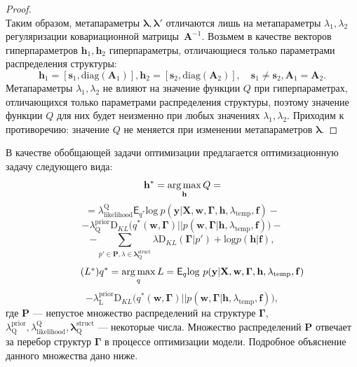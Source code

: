 \begin{proof}
\[\]
Таким образом, метапараметры $\boldsymbol{\lambda},\boldsymbol{\lambda}'$ отличаются лишь на метапараметры  $\lambda_1, \lambda_2$ регуляризации ковариационной матрицы~$\mathbf{A}^{-1}$. 
Возьмем в качестве векторов гиперпараметров $\mathbf{h}_1,\mathbf{h}_2$ гиперпараметры, отличающиеся только параметрами распределения структуры:
\[
    \mathbf{h}_1 = [\mathbf{s}_1, \text{diag}(\mathbf{A}_1)], \mathbf{h}_2 = [\mathbf{s}_2, \text{diag}(\mathbf{A}_2)],\quad \mathbf{s}_1 \neq \mathbf{s}_2, \mathbf{A}_1 = \mathbf{A}_2.
\]
Метапараметры $\lambda_1, \lambda_2$ не влияют на значение функции $Q$ при гиперпараметрах, отличающихся только параметрами распределения структуры, поэтому значение функции $Q$ для них будет неизменно при любых значениях $\lambda_1, \lambda_2$. Приходим к противоречию: значение $Q$ не меняется при изменении метапараметров $\boldsymbol{\lambda}$.

\end{proof}

В качестве обобщающей задачи оптимизации предлагается оптимизационную задачу следующего вида:
\begin{equation}
\label{eq:qopt}
\mathbf{h}^{*} = \operatorname*{arg\,max}_{\mathbf{h}} Q = 
\end{equation}
\[
= {\lambda_\text{likelihood}^\text{Q}\mathsf{E}_{{q}^{*}} \text{log}~{p(\mathbf{y} | \mathbf{X}, \mathbf{w},\boldsymbol{\Gamma}, \mathbf{h}, \lambda_\text{temp}, \mathbf{f})}}
 -\]
\vspace{-0.3cm}
\[- {\lambda^\text{prior}_\text{Q}\text{D}_{KL}\bigl( q^{*}(\mathbf{w}, \boldsymbol{\Gamma}) || p(\mathbf{w}, \boldsymbol{\Gamma} |\mathbf{h}, \lambda_{\text{temp}},\mathbf{f}) \bigr)}  -\]
\vspace{-0.3cm}
\[
-{\sum_{p' \in \mathbf{P}, \lambda \in \boldsymbol{\lambda}^\text{struct}_\text{Q}} \lambda\text{D}_{KL}(\boldsymbol{\Gamma} | p')+\text{log}p(\mathbf{h}|\mathbf{f})}, 
\]
\begin{equation}
\tag{$L^{*}$}
{q}^{*} = \argmax_{q} L = 
{\mathsf{E}_q \text{log}~{p(\mathbf{y} | \mathbf{X}, \mathbf{w}, \boldsymbol{\Gamma}, \mathbf{h}, \lambda_{\text{temp}}, \mathbf{f})}}
\end{equation}
\vspace{-0.3cm}
\[- {\lambda^\text{prior}_\text{L}\text{D}_{KL}\bigl( q^{*}(\mathbf{w}, \boldsymbol{\Gamma}) || p(\mathbf{w}, \boldsymbol{\Gamma} |\mathbf{h}, \lambda_{\text{temp}},\mathbf{f}) \bigr)},
\]
где $\mathbf{P}$ --- непустое множество распределений на структуре $\boldsymbol{\Gamma}$, $\lambda^\text{prior}_\text{Q}, \lambda_\text{likelihood}^\text{Q}, \boldsymbol{\lambda}^\text{struct}_\text{Q}$ --- некоторые числа. Множество распределений $\mathbf{P}$ отвечает за перебор структур $\boldsymbol{\Gamma}$ в процессе оптимизации модели. Подробное объяснение данного множества дано ниже. 


